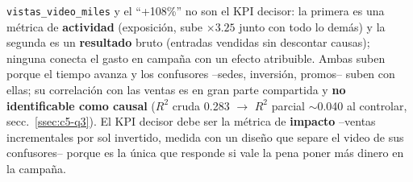 \texttt{vistas\_video\_miles} y el ``+108\%'' no son el KPI decisor: la primera es una métrica de \textbf{actividad} (exposición, sube $\times3.25$ junto con todo lo demás) y la segunda es un \textbf{resultado} bruto (entradas vendidas sin descontar causas); ninguna conecta el gasto en campaña con un efecto atribuible. Ambas suben porque el tiempo avanza y los confusores --sedes, inversión, promos-- suben con ellas; su correlación con las ventas es en gran parte compartida y \textbf{no identificable como causal} ($R^2$ cruda 0.283 $\to$ $R^2$ parcial $\sim$0.040 al controlar, secc.~\ref{ssec:c5-q3}). El KPI decisor debe ser la métrica de \textbf{impacto} --ventas incrementales por sol invertido, medida con un diseño que separe el video de sus confusores-- porque es la única que responde si vale la pena poner más dinero en la campaña.
